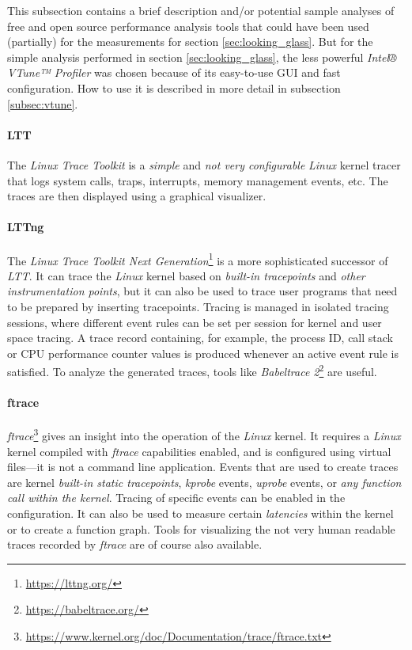     This subsection contains a brief description and/or potential sample analyses of free and open source performance analysis tools that could have been used (partially) for the measurements for section \ref{sec:looking_glass}. But for the simple analysis performed in section \ref{sec:looking_glass}, the less powerful \textit{Intel® VTune™ Profiler} was chosen because of its easy-to-use GUI and fast configuration. How to use it is described in more detail in subsection \ref{subsec:vtune}.

\paragraph{LTT}

    The \textit{Linux Trace Toolkit} is a \emph{simple} and \emph{not very configurable} \textit{Linux} kernel tracer that logs system calls, traps, interrupts, memory management events, etc. The traces are then displayed using a graphical visualizer.

\paragraph{LTTng}

    The \textit{Linux Trace Toolkit Next Generation}\footnote{\url{https://lttng.org/}} is a more sophisticated successor of \textit{LTT}. It can trace the \textit{Linux} kernel based on \emph{built-in tracepoints} and \emph{other instrumentation points}, but it can also be used to trace user programs that need to be prepared by inserting tracepoints. Tracing is managed in isolated tracing sessions, where different event rules can be set per session for kernel and user space tracing. A trace record containing, for example, the process ID, call stack or CPU performance counter values is produced whenever an active event rule is satisfied. To analyze the generated traces, tools like \textit{Babeltrace 2}\footnote{\url{https://babeltrace.org/}} are useful.

\paragraph{ftrace}

    \textit{ftrace}\footnote{\url{https://www.kernel.org/doc/Documentation/trace/ftrace.txt}} gives an insight into the operation of the \textit{Linux} kernel. It requires a \textit{Linux} kernel compiled with \textit{ftrace} capabilities enabled, and is configured using virtual files---it is not a command line application. Events that are used to create traces are kernel \emph{built-in static tracepoints}, \textit{kprobe} events, \textit{uprobe} events, or \emph{any function call within the kernel}. Tracing of specific events can be enabled in the configuration. It can also be used to measure certain \emph{latencies} within the kernel or to create a function graph. Tools for visualizing the not very human readable traces recorded by \textit{ftrace} are of course also available.

